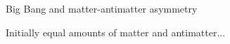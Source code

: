 \documentclass{beamer}
\begin{document}
\begin{frame}{Big Bang and matter-antimatter asymmetry}
  \begin{figure}
  \end{figure}
  \begin{center}
    \Large Initially equal amounts of matter and antimatter...
  \end{center}
\end{frame}
\end{document}
